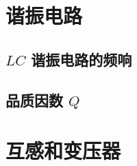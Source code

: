 \documentclass[UTF8]{report}
\theoremstyle{MyLineTheoremStyle} %
\theoremstyle{MyBlockTheoremStyle} %
\theoremstyle{MySubsubsectionStyle} %
\begin{document}
\section{谐振电路}
\subsection{$LC$ 谐振电路的频响}
\subsection{品质因数 $Q$}

\section{互感和变压器}
\end{document}
